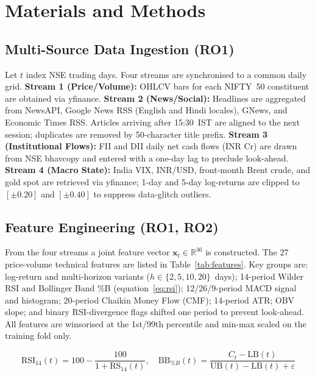 \documentclass[12pt,a4paper]{article}
\begin{document}
\section{Materials and Methods}

\subsection{Multi-Source Data Ingestion (RO1)}

Let $t$ index NSE trading days. Four streams are synchronised to a common
daily grid. \textbf{Stream 1 (Price/Volume):} OHLCV bars for each NIFTY~50
constituent are obtained via yfinance. \textbf{Stream 2 (News/Social):} Headlines
are aggregated from NewsAPI, Google News RSS (English and Hindi locales), GNews,
and Economic Times RSS. Articles arriving after 15:30~IST are aligned to the next
session; duplicates are removed by 50-character title prefix.
\textbf{Stream 3 (Institutional Flows):} FII and DII daily net cash flows (INR Cr)
are drawn from NSE bhavcopy and entered with a one-day lag to preclude look-ahead.
\textbf{Stream 4 (Macro State):} India VIX, INR/USD, front-month Brent crude, and
gold spot are retrieved via yfinance; 1-day and 5-day log-returns are clipped to
$[\pm0.20]$ and $[\pm0.40]$ to suppress data-glitch outliers.

\subsection{Feature Engineering (RO1, RO2)}

From the four streams a joint feature vector $\mathbf{x}_{t}\!\in\!\mathbb{R}^{36}$
is constructed. The 27 price-volume technical features are listed in
Table~\ref{tab:features}. Key groups are: log-return and multi-horizon variants
($h\!\in\!\{2,5,10,20\}$~days); 14-period Wilder RSI and Bollinger Band \%B
(equation~\eqref{eq:rsi}); 12/26/9-period MACD signal and histogram;
20-period Chaikin Money Flow (CMF); 14-period ATR; OBV slope; and binary
RSI-divergence flags shifted one period to prevent look-ahead. All features are
winsorised at the 1st/99th percentile and min-max scaled on the training fold only.

\begin{equation}
\mathrm{RSI}_{14}(t)=100-\frac{100}{1+\mathrm{RS}_{14}(t)},\quad
\mathrm{BB}_{\%B}(t)=\frac{C_t-\mathrm{LB}(t)}{\mathrm{UB}(t)-\mathrm{LB}(t)+\varepsilon}
\label{eq:rsi}
\end{equation}
\end{document}
